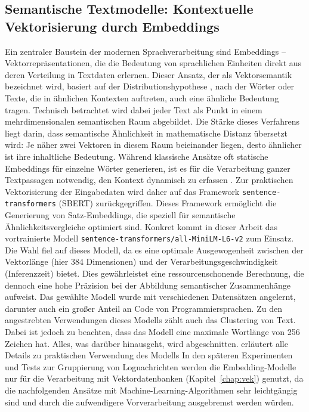 \subsection{Semantische Textmodelle: Kontextuelle Vektorisierung durch Embeddings}
Ein zentraler Baustein der modernen Sprachverarbeitung sind Embeddings – Vektorrepräsentationen, die die Bedeutung von sprachlichen Einheiten direkt aus deren Verteilung in Textdaten erlernen. Dieser Ansatz, der als Vektorsemantik bezeichnet wird, basiert auf der Distributionshypothese \cite[Kap.~5]{jm3}, nach der Wörter oder Texte, die in ähnlichen Kontexten auftreten, auch eine ähnliche Bedeutung tragen. Technisch betrachtet wird dabei jeder Text als Punkt in einem mehrdimensionalen semantischen Raum abgebildet. Die Stärke dieses Verfahrens liegt darin, dass semantische Ähnlichkeit in mathematische Distanz übersetzt wird: Je näher zwei Vektoren in diesem Raum beieinander liegen, desto ähnlicher ist ihre inhaltliche Bedeutung.
Während klassische Ansätze oft statische Embeddings für einzelne Wörter generieren, ist es für die Verarbeitung ganzer Textpassagen notwendig, den Kontext dynamisch zu erfassen \cite[Kap.~5.5]{jm3}. Zur praktischen Vektorisierung der Eingabedaten wird daher auf das Framework \texttt{sentence-transformers} (\acs{SBERT})\cite{ReimersSentenceTransformers} zurückgegriffen. Dieses Framework ermöglicht die Generierung von Satz-Embeddings, die speziell für semantische Ähnlichkeitsvergleiche optimiert sind.
Konkret kommt in dieser Arbeit das vortrainierte Modell \texttt{sentence-transformers/all-MiniLM-L6-v2} \cite{HuggingFaceAllMiniLML6v2} zum Einsatz. Die Wahl fiel auf dieses Modell, da es eine optimale Ausgewogenheit zwischen der Vektorlänge (hier 384 Dimensionen) und der Verarbeitungsgeschwindigkeit (Inferenzzeit) bietet. Dies gewährleistet eine ressourcenschonende Berechnung, die dennoch eine hohe Präzision bei der Abbildung semantischer Zusammenhänge aufweist. Das gewählte Modell wurde mit verschiedenen Datensätzen angelernt, darunter auch ein großer Anteil an Code von Programmiersprachen. Zu den angestrebten Verwendungen dieses Modells zählt auch das Clustering von Text. Dabei ist jedoch zu beachten, dass das Modell eine maximale Wortlänge von 256 Zeichen hat. Alles, was darüber hinausgeht, wird abgeschnitten.\cite{HuggingFaceAllMiniLML6v2} erläutert alle Details zu praktischen Verwendung des Modells In den späteren Experimenten und Tests zur Gruppierung von Lognachrichten werden die Embedding-Modelle nur für die Verarbeitung mit Vektordatenbanken (Kapitel~\ref{chap:vek}) genutzt, da die nachfolgenden Ansätze mit Machine-Learning-Algorithmen sehr leichtgängig sind und durch die aufwendigere Vorverarbeitung ausgebremst werden würden. 

